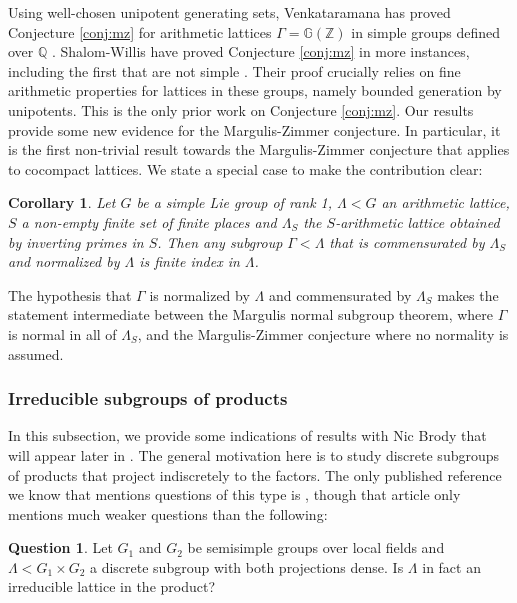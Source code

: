 \documentclass[JEP,XML,SOM,Unicode,published]{cedram}
\newcommand{\G}{\ensuremath{\mathbb{G}}}
\newcommand{\bbQ}{\ensuremath{\mathbb{Q}}}
\newcommand{\bbZ}{\ensuremath{\mathbb{Z}}}
\newtheorem{cor}[thm]{Corollary}
\theoremstyle{definition}
\newtheorem{question}[thm]{Question}
\begin{document}
Using well-chosen unipotent generating sets, Venkataramana has proved Conjecture \ref{conj:mz} for arithmetic lattices $\Gamma=\G(\bbZ)$ in simple groups defined over $\bbQ$ \cite{venkataramana-mz}. Shalom-Willis have proved Conjecture \ref{conj:mz} in more instances, including the first that are not simple \cite{shalom-willis}. Their proof crucially relies on fine arithmetic properties for lattices in these groups, namely bounded generation by unipotents. This is the only prior work on Conjecture \ref{conj:mz}. Our results provide some new evidence for the Margulis-Zimmer conjecture. In particular, it is the first non-trivial result towards the Margulis-Zimmer conjecture that applies to cocompact lattices. We state a special case to make the contribution clear:

\begin{cor}
\label{corollary:marguliszimmer}
Let $G$ be a simple Lie group of rank 1, $\Lambda < G$ an arithmetic lattice, $S$ a non-empty finite set of finite places and $\Lambda_S$ the $S$-arithmetic lattice obtained by inverting primes in $S$. Then any subgroup $\Gamma< \Lambda$ that is commensurated by $\Lambda_S$ and normalized by $\Lambda$ is finite index in $\Lambda$.
\end{cor}

\noindent The hypothesis that $\Gamma$ is normalized by $\Lambda$ and commensurated by $\Lambda_S$ makes the statement intermediate between the Margulis normal subgroup theorem, where $\Gamma$ is normal in all of $\Lambda_S$, and the Margulis-Zimmer conjecture where no normality is assumed.

\subsubsection{Irreducible subgroups of products}
\label{subsec:products}

In this subsection, we provide some indications of results with Nic Brody that will appear later in \cite{BFMVL}.
The general motivation here is to study discrete subgroups of products that project indiscretely to the factors.
The only published reference we know that mentions questions of this type is \cite{FLSS}, though that article
only mentions much weaker questions than the following:

\begin{question}
\label{qtn:irreducible}
Let $G_1$ and $G_2$ be semisimple groups over local fields and $\Lambda < G_1 \times G_2$ a discrete subgroup with both projections dense. Is $\Lambda$ in fact an irreducible lattice in the product?
\end{question}
\end{document}
